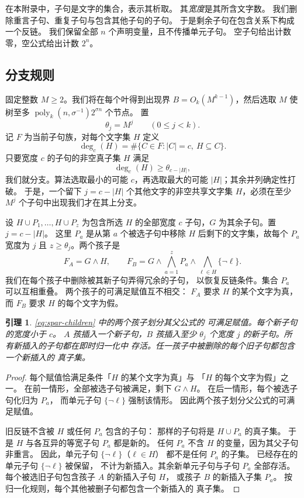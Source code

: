 \documentclass[11pt,reqno]{amsart}
\numberwithin{equation}{section}
\newtheorem{lemma}[theorem]{引理}
\theoremstyle{definition}\newtheorem{definition}[theorem]{定义}
\theoremstyle{remark}\newtheorem{remark}[theorem]{注}
\newcommand{\poly}{\operatorname{poly}}
\renewcommand{\le}{\leqslant}
\renewcommand{\ge}{\geqslant}
\begin{document}
在本附录中，子句是文字的集合，表示其析取。
其\emph{宽度}是其所含文字数。
我们删除重言子句、重复子句与包含其他子句的子句。
于是剩余子句在包含关系下构成一个反链。
我们保留全部 $n$ 个声明变量，且不传播单元子句。
空子句给出计数零，空公式给出计数 $2^n$。

\subsection{分支规则}

固定整数 $M\ge2$。我们将在每个叶得到出现界
$B=O_k(M^{k-1})$，然后选取 $M$ 使树至多
$\poly_k(n,\sigma^{-1})2^{\sigma n}$ 个节点。
置
\[
 \theta_j=M^j\qquad(0\le j<k).
\]
记 $F$ 为当前子句族，对每个文字集 $H$ 定义
\[
 \deg_c(H)=\#\{C\in F:|C|=c,\ H\subseteq C\}.
\]
只要宽度 $c$ 的子句的非空真子集 $H$ 满足
\begin{equation}\label{eq:spar-violation}
 \deg_c(H)\ge\theta_{c-|H|},
\end{equation}
我们就分支。算法选取最小的可能 $c$，再选取最大的可能
$|H|$；其余并列确定性打破。
于是，一个留下 $j=c-|H|$ 个其他文字的非空共享文字集
$H$，必须在至少 $M^j$ 个子句中出现我们才在其上分支。

设 $H\cup P_1,\ldots,H\cup P_z$ 为包含所选 $H$
的全部宽度 $c$ 子句，$G$ 为其余子句。置 $j=c-|H|$。
这里 $P_a$ 是从第 $a$ 个被选子句中移除 $H$
后剩下的文字集，故每个 $P_a$ 宽度为 $j$ 且
$z\ge\theta_j$。两个孩子是
\begin{equation}\label{eq:spar-children}
 F_A=G\wedge H,\qquad
 F_B=G\wedge\bigwedge_{a=1}^zP_a
          \wedge\bigwedge_{\ell\in H}\{\neg\ell\}.
\end{equation}
我们在每个孩子中删除被其新子句弄得冗余的子句，
以恢复反链条件。集合 $P_a$ 可以互相重叠。
两个孩子的可满足赋值互不相交：
$F_A$ 要求 $H$ 的某个文字为真，
而 $F_B$ 要求 $H$ 的每个文字为假。

\begin{lemma}\label{lem:spar-branch}
\eqref{eq:spar-children} 中的两个孩子划分其父公式的
可满足赋值。每个新子句的宽度小于 $c$。
$A$ 孩插入一个新子句，$B$ 孩插入至少 $\theta_j$
个宽度 $j$ 的新子句。所有新插入的子句都在即时归一化中
存活。任一孩子中被删除的每个旧子句都包含一个新插入的
真子集。
\end{lemma}
\begin{proof}
每个赋值恰满足条件「$H$ 的某个文字为真」与
「$H$ 的每个文字为假」之一。
在前一情形，全部被选子句被满足，剩下 $G\wedge H$。
在后一情形，每个被选子句化归为 $P_a$，
而单元子句 $\{\neg\ell\}$ 强制该情形。
因此两个孩子划分父公式的可满足赋值。

旧反链不含被 $H$ 或任何 $P_a$ 包含的子句：
那样的子句将是 $H\cup P_a$ 的真子集。
于是 $H$ 与各互异的等宽子句 $P_a$ 都是新的。
任何 $P_a$ 不含 $H$ 的变量，因为其父子句非重言。
因此，单元子句 $\{\neg\ell\}$（$\ell\in H$）
都不是任何 $P_a$ 的子集。
已经存在的单元子句 $\{\neg\ell\}$ 被保留，
不计为新插入。其余新单元子句与子句 $P_a$ 全部存活。
每个被选旧子句包含孩子 $A$ 的新插入子句 $H$，
或孩子 $B$ 的新插入子集 $P_a$。
按归一化规则，每个其他被删子句都包含一个新插入的
真子集。
\end{proof}
\end{document}

